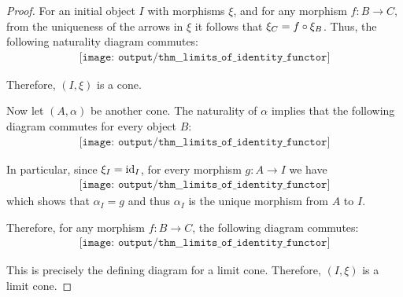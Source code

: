 \begin{proof}
   For an initial object \( I \) with morphisms \( \xi \), and for any morphism \( f: B \to C \), from the uniqueness of the arrows in \( \xi \) it follows that \( \xi_C = f \bincirc \xi_B \). Thus, the following naturality diagram commutes:
  \begin{equation}\label{eq:def:thm:limits_of_identity_functor/initial_object_ks_limit/nat}
    \begin{aligned}
      \texttt{[image: output/thm\_\_limits\_of\_identity\_functor]}
    \end{aligned}
  \end{equation}

  Therefore, \( (I, \xi) \) is a cone.

  Now let \( (A, \alpha) \) be another cone. The naturality of \( \alpha \) implies that the following diagram commutes for every object \( B \):
  \begin{equation}\label{eq:def:thm:limits_of_identity_functor/initial_object_ks_limit/half_limit}
    \begin{aligned}
      \texttt{[image: output/thm\_\_limits\_of\_identity\_functor]}
    \end{aligned}
  \end{equation}

  In particular, since \( \xi_I = \operatorname{id}_I \), for every morphism \( g: A \to I \) we have
  \begin{equation}\label{eq:def:thm:limits_of_identity_functor/initial_object_ks_limit/cone_morphism_uniqueness}
    \begin{aligned}
      \texttt{[image: output/thm\_\_limits\_of\_identity\_functor]}
    \end{aligned}
  \end{equation}
  which shows that \( \alpha_I = g \) and thus \( \alpha_I \) is the unique morphism from \( A \) to \( I \).

  Therefore, for any morphism \( f: B \to C \), the following diagram commutes:
  \begin{equation}\label{eq:def:thm:limits_of_identity_functor/initial_object_ks_limit/limit}
    \begin{aligned}
      \texttt{[image: output/thm\_\_limits\_of\_identity\_functor]}
    \end{aligned}
  \end{equation}

  This is precisely the defining diagram for a limit cone. Therefore, \( (I, \xi) \) is a limit cone.


\end{proof}
